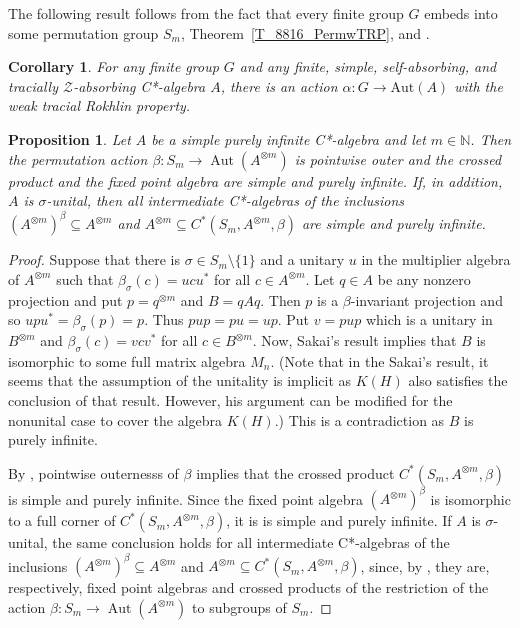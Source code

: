 \documentclass[11pt]{amsart}
\theoremstyle{plain}
\newtheorem{proposition}[theorem]{Proposition}
\newtheorem{corollary}[theorem]{Corollary}
\theoremstyle{definition}
\theoremstyle{remark}
\numberwithin{equation}{section}
\newcommand{\bt}{\beta}
\newcommand{\Aut}{{\operatorname{Aut}}}
\begin{document}
The following result follows from the fact that every
finite group $G$ embeds into some permutation group
$S_m$, Theorem~\ref{T_8816_PermwTRP}, and \cite[Proposition~4.1]{FG17}.

\begin{corollary}\label{cor_per_any}
For any finite group $G$ and any finite, simple,
self-absorbing, and tracially $\mathcal{Z}$-absorbing C*-algebra $A$,
there is an action  $\alpha \colon G \to \mathrm{Aut} (A)$ with
the weak tracial Rokhlin property.
\end{corollary}




\begin{proposition}\label{prop_outer}
Let $A$ be a simple  
purely infinite C*-algebra and let
 $m\in\mathbb{N}$. Then
 the permutation action $\bt \colon S_m \to \Aut (A^{\otimes m})$
 is pointwise outer and the crossed product and the fixed
 point algebra are simple and purely infinite.
 If, in addition, $A$ is $\sigma$-unital,
 then all intermediate C*-algebras of the inclusions
$(A^{\otimes m})^\beta \subseteq A^{\otimes m}$ and 
$A^{\otimes m} \subseteq C^*(S_m, A^{\otimes m},\beta)$
are simple and purely infinite. 
\end{proposition}

\begin{proof}
Suppose that there is $\sigma\in S_m\setminus \{1\}$
and a unitary $u$ in the multiplier algebra of $A^{\otimes m}$
such that $\beta_\sigma(c)=ucu^*$ for all $c\in A^{\otimes m}$.
Let $q\in A$ be any nonzero projection and put
$p=q^{\otimes m}$ and $B=qAq$. Then $p$ is a $\beta$-invariant projection
and so $upu^*=\beta_\sigma(p)=p$. Thus $pup=pu=up$. Put
$v=pup$ which is a unitary in $B^{\otimes m}$ and
$\beta_\sigma(c)=vcv^*$ for all $c\in B^{\otimes m}$.
Now, Sakai's result \cite[Theorem~7]{Sakai1975} implies that 
$B$ is isomorphic
to some full matrix algebra $M_n$.
(Note that in the Sakai's result, it seems that
the assumption of the unitality is implicit as
$K(H)$ also satisfies the conclusion of that result.
However, his argument can be modified for the nonunital
case to cover the algebra $K(H)$.)
This is a contradiction as $B$ is purely infinite.


By \cite[Theorem~3]{Jeong1995},
pointwise outernesss of $\beta$ implies that
the crossed product $ C^*(S_m, A^{\otimes m},\beta)$
is simple and purely infinite. Since the fixed
point algebra $(A^{\otimes m})^\beta$ is isomorphic
to a full corner of $ C^*(S_m, A^{\otimes m},\beta)$,
it is is simple and purely infinite.
If $A$ is $\sigma$-unital,
the same conclusion holds for all
intermediate C*-algebras of the inclusions
$(A^{\otimes m})^\beta \subseteq A^{\otimes m}$ and 
$A^{\otimes m} \subseteq C^*(S_m, A^{\otimes m},\beta)$,
since, by \cite[Corollary~6.6]{Izumi2002}, they are, 
respectively,
 fixed point algebras and crossed products
 of the restriction of the action 
 $\bt \colon S_m \to \Aut (A^{\otimes m})$ to 
 subgroups of $S_m$.
\end{proof}
\end{document}
